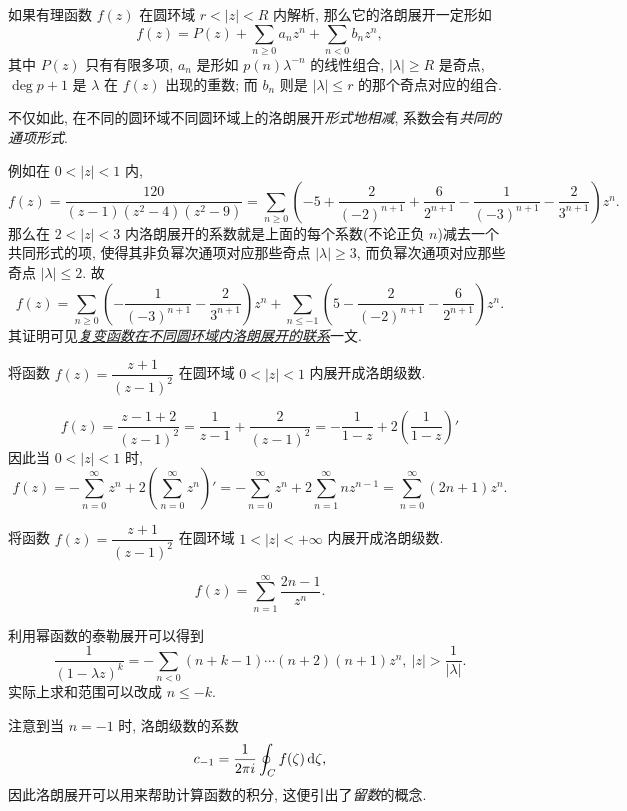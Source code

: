 如果有理函数 $f(z)$ 在圆环域 $r<|z|<R$ 内解析, 那么它的洛朗展开一定形如
\[f(z)=P(z)+\sum_{n\ge 0}a_n z^n+\sum_{n<0}b_n z^n,\]
其中 $P(z)$ 只有有限多项, 
$a_n$ 是形如 $p(n)\lambda^{-n}$ 的线性组合, $|\lambda|\ge R$ 是奇点, $\deg p+1$ 是 $\lambda$ 在 $f(z)$ 出现的重数; 而 $b_n$ 则是 $|\lambda|\le r$ 的那个奇点对应的组合.

不仅如此, 在不同的圆环域不同圆环域上的洛朗展开{\itshape 形式地相减}, 系数会有\emph{共同的通项形式}.

例如在 $0<|z|<1$ 内,
\[f(z)=\frac{120}{(z-1)(z^2-4)(z^2-9)}=\sum_{n\ge 0}\left(-5+\frac2{(-2)^{n+1}}+\frac6{2^{n+1}}-\frac1{(-3)^{n+1}}-\frac2{3^{n+1}}\right)z^n.\]
那么在 $2<|z|<3$ 内洛朗展开的系数就是上面的每个系数(不论正负 $n$)减去一个共同形式的项, 使得其非负幂次通项对应那些奇点 $|\lambda|\ge 3$, 而负幂次通项对应那些奇点 $|\lambda|\le2$.
故
\[f(z)=\sum_{n\ge 0}\left(-\frac1{(-3)^{n+1}}-\frac2{3^{n+1}}\right)z^n+\sum_{n\le-1}\left(5-\frac2{(-2)^{n+1}}-\frac6{2^{n+1}}\right)z^n.\]
其证明可见\emph{\href{https://zhangshenxing.gitee.io/teaching/publications/袁志杰张神星2023 复变函数在不同圆环域内洛朗展开的联系.pdf}{复变函数在不同圆环域内洛朗展开的联系}}一文.

\begin{example}
	将函数 $f(z)=\dfrac{z+1}{(z-1)^2}$ 在圆环域 $0<|z|<1$ 内展开成洛朗级数.
\end{example}

\begin{solution}
	\[f(z)=\frac{z-1+2}{(z-1)^2}=\frac1{z-1}+\frac{2}{(z-1)^2}=-\frac1{1-z}+2\left(\frac1{1-z}\right)'\]
	{因此当 $0<|z|<1$ 时,
		\[f(z)=-\sum_{n=0}^\infty z^n+2\left(\sum_{n=0}^\infty z^n\right)'=-\sum_{n=0}^\infty z^n+2\sum_{n=1}^\infty nz^{n-1}
		=\sum_{n=0}^\infty(2n+1)z^n.\]}
\end{solution}

\begin{exercise}
	将函数 $f(z)=\dfrac{z+1}{(z-1)^2}$ 在圆环域 $1<|z|<+\infty$ 内展开成洛朗级数.
\end{exercise}

\begin{answer}
	\[f(z)=\sum_{n=1}^\infty \frac{2n-1}{z^n}.\]
\end{answer}
利用幂函数的泰勒展开可以得到
\[\frac1{(1-\lambda z)^k}=-\sum_{n<0}(n+k-1)\cdots(n+2)(n+1)z^n,\ |z|>\frac1{|\lambda|}.\]
实际上求和范围可以改成 $n\le -k$.

注意到当 $n=-1$ 时, 洛朗级数的系数
\[c_{-1}=\frac1{2\pi i}\oint_C f(\zeta)\,\mathrm{d}\zeta,\]
因此洛朗展开可以用来帮助计算函数的积分,
这便引出了\emph{留数}的概念.


